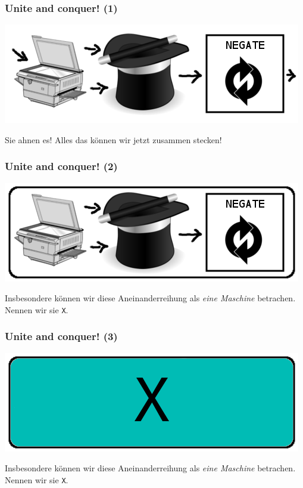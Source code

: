 \documentclass[aspectratio=43]{beamer}
\begin{document}

\begin{frame}
\frametitle{Unite and conquer! (1)}
\begin{center}
\includegraphics[scale=1.4]{images/complete.png} 
\bigskip

Sie ahnen es! Alles das können wir jetzt zusammen stecken!
\end{center}
\end{frame}


\begin{frame}
\frametitle{Unite and conquer! (2)}
\begin{center}
\includegraphics[scale=1.4]{images/complete_border.png} 
\bigskip

Insbesondere können wir diese Aneinanderreihung als \emph{eine Maschine} betrachen. Nennen wir sie \texttt{X}.
\end{center}
\end{frame}


\begin{frame}
\frametitle{Unite and conquer! (3)}
\begin{center}
\includegraphics[scale=1.4]{images/complete_border_filled.png} 
\bigskip

Insbesondere können wir diese Aneinanderreihung als \emph{eine Maschine} betrachen. Nennen wir sie \texttt{X}.
\end{center}
\end{frame}
\end{document}
